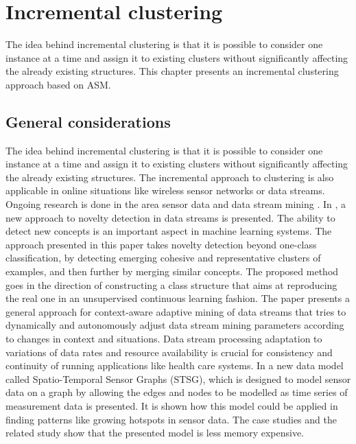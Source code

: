 \section{Incremental clustering}
\label{chap:incrementalclustering}

The idea behind incremental clustering is that it is possible to consider one instance at a time and assign it to existing clusters without significantly affecting the already existing structures. This chapter presents an incremental clustering approach based on ASM.

\subsection{General considerations}

The idea behind incremental clustering is that it is possible to consider one instance at a time and assign it to existing clusters without significantly affecting the already existing structures. The incremental approach to clustering is also applicable in online situations like wireless sensor networks or data streams. Ongoing research is done in the area sensor data and data stream mining \cite{Spinosa09Novelty,Haghighi09Context,George09Spatio}. In \cite{Spinosa09Novelty}, a new approach to novelty detection in data streams is presented. The ability to detect new concepts is an important aspect in machine learning systems. The approach presented in this paper \cite{Spinosa09Novelty} takes novelty detection beyond one-class classification, by detecting emerging cohesive and representative clusters of examples, and then further by merging similar concepts. The proposed method goes in the direction of constructing a class structure that aims at reproducing the real one in an unsupervised continuous learning fashion. The paper \cite{Haghighi09Context} presents a general approach for context-aware adaptive mining of data streams that tries to dynamically and autonomously adjust data stream mining parameters according to changes in context and situations. Data stream processing adaptation to variations of data rates and resource availability is crucial for consistency and continuity of running applications like health care systems.  In \cite{George09Spatio} a new data model called Spatio-Temporal Sensor Graphs (STSG), which is designed to model sensor data on a graph by allowing the edges and nodes to be modelled as time series of measurement data is presented. It is shown how this model could be applied in finding patterns like growing hotspots in sensor data. The case studies and the related study show that the presented model is less memory expensive. 

